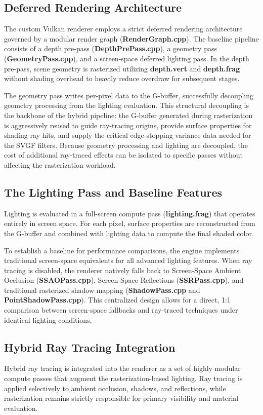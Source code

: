 \documentclass[12pt,a4paper]{report}
\begin{document}
\subsection{Deferred Rendering Architecture}
The custom Vulkan renderer employs a strict deferred rendering architecture governed by a modular render graph (\textbf{RenderGraph.cpp}).
The baseline pipeline consists of a depth pre-pass (\textbf{DepthPrePass.cpp}), a geometry pass (\textbf{GeometryPass.cpp}), and a screen-space deferred lighting pass.
In the depth pre-pass, scene geometry is rasterized utilizing \textbf{depth.vert} and \textbf{depth.frag} without shading overhead to heavily reduce overdraw for subsequent stages.

The geometry pass writes per-pixel data to the G-buffer, successfully decoupling geometry processing from the lighting evaluation. This structural decoupling is the backbone of the hybrid pipeline:
the G-buffer generated during rasterization is aggressively reused to guide ray-tracing origins, provide surface properties for shading ray hits, and supply the critical edge-stopping variance data needed for the SVGF filters.
Because geometry processing and lighting are decoupled, the cost of additional ray-traced effects can be isolated to specific passes without affecting the rasterization workload.

\subsection{The Lighting Pass and Baseline Features}
Lighting is evaluated in a full-screen compute pass (\textbf{lighting.frag}) that operates entirely in screen space.
For each pixel, surface properties are reconstructed from the G-buffer and combined with lighting data to compute the final shaded color.

To establish a baseline for performance comparisons, the engine implements traditional screen-space equivalents for all advanced lighting features.
When ray tracing is disabled, the renderer natively falls back to Screen-Space Ambient Occlusion (\textbf{SSAOPass.cpp}), Screen-Space Reflections (\textbf{SSRPass.cpp}),
and traditional rasterized shadow mapping (\textbf{ShadowPass.cpp} and \textbf{PointShadowPass.cpp}). This centralized design allows for a direct, 1:1 comparison between screen-space fallbacks and ray-traced techniques under identical lighting conditions.

\subsection{Hybrid Ray Tracing Integration}
Hybrid ray tracing is integrated into the renderer as a set of highly modular compute passes that augment the rasterization-based lighting.
Ray tracing is applied selectively to ambient occlusion, shadows, and reflections, while rasterization remains strictly responsible for primary visibility and material evaluation.
\end{document}
